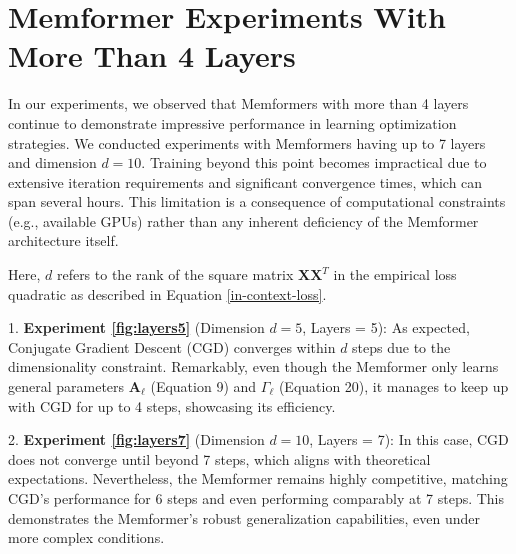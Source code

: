 \documentclass[11pt]{article}
\numberwithin{equation}{section}
\begin{document}
\section{Memformer Experiments With More Than 4 Layers}

In our experiments, we observed that Memformers with more than 4 layers continue to demonstrate impressive performance in learning optimization strategies. We conducted experiments with Memformers having up to 7 layers and dimension \( d = 10 \). Training beyond this point becomes impractical due to extensive iteration requirements and significant convergence times, which can span several hours. This limitation is a consequence of computational constraints (e.g., available GPUs) rather than any inherent deficiency of the Memformer architecture itself.

Here, \( d \) refers to the rank of the square matrix \( \mathbf{X} \mathbf{X}^T \) in the empirical loss quadratic as described in Equation \ref{in-context-loss}.

1. \textbf{Experiment \ref{fig:layers5}} (Dimension \( d = 5 \), Layers = 5): As expected, Conjugate Gradient Descent (CGD) converges within \( d \) steps due to the dimensionality constraint. Remarkably, even though the Memformer only learns general parameters \( \mathbf{A}_\ell \) (Equation 9) and \( \Gamma_\ell \) (Equation 20), it manages to keep up with CGD for up to 4 steps, showcasing its efficiency.

2. \textbf{Experiment \ref{fig:layers7}} (Dimension \( d = 10 \), Layers = 7): In this case, CGD does not converge until beyond 7 steps, which aligns with theoretical expectations. Nevertheless, the Memformer remains highly competitive, matching CGD's performance for 6 steps and even performing comparably at 7 steps. This demonstrates the Memformer’s robust generalization capabilities, even under more complex conditions.
\end{document}
